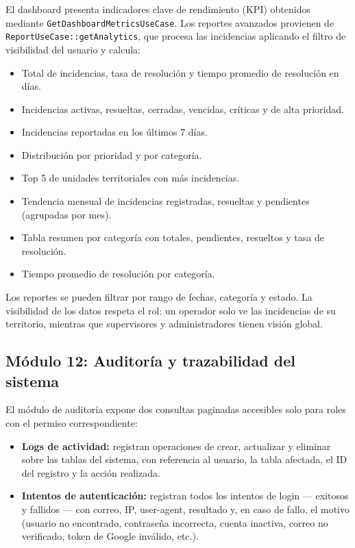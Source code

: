 \documentclass[12pt,a4paper]{article}
\begin{document}
El dashboard presenta indicadores clave de rendimiento (KPI) obtenidos mediante
\texttt{GetDashboardMetricsUseCase}. Los reportes avanzados provienen de
\texttt{ReportUseCase::getAnalytics}, que procesa las incidencias aplicando el
filtro de visibilidad del usuario y calcula:

\begin{itemize}
    \item Total de incidencias, tasa de resolución y tiempo promedio de resolución
          en días.
    \item Incidencias activas, resueltas, cerradas, vencidas, críticas y de alta
          prioridad.
    \item Incidencias reportadas en los últimos 7 días.
    \item Distribución por prioridad y por categoría.
    \item Top 5 de unidades territoriales con más incidencias.
    \item Tendencia mensual de incidencias registradas, resueltas y pendientes
          (agrupadas por mes).
    \item Tabla resumen por categoría con totales, pendientes, resueltos y tasa
          de resolución.
    \item Tiempo promedio de resolución por categoría.
\end{itemize}

Los reportes se pueden filtrar por rango de fechas, categoría y estado. La
visibilidad de los datos respeta el rol: un operador solo ve las incidencias
de su territorio, mientras que supervisores y administradores tienen visión global.

\subsection{Módulo 12: Auditoría y trazabilidad del sistema}

El módulo de auditoría expone dos consultas paginadas accesibles solo para roles
con el permiso correspondiente:

\begin{itemize}
    \item \textbf{Logs de actividad:} registran operaciones de crear, actualizar
          y eliminar sobre las tablas del sistema, con referencia al usuario, la
          tabla afectada, el ID del registro y la acción realizada.
    \item \textbf{Intentos de autenticación:} registran todos los intentos de
          login --- exitosos y fallidos --- con correo, IP, user-agent, resultado
          y, en caso de fallo, el motivo (usuario no encontrado, contraseña
          incorrecta, cuenta inactiva, correo no verificado, token de Google
          inválido, etc.).
\end{itemize}
\end{document}
